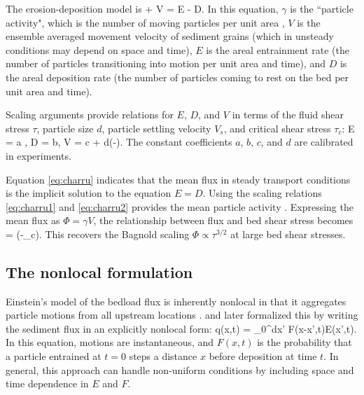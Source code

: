 The erosion-deposition model is
\be \pt \gamma +  \px V \gamma = E - D. \label{eq:charru}\ee
In this equation, $\gamma$ is the ``particle activity", which is the number of moving particles per unit area \citep{Furbish2012}, $V$ is the ensemble averaged movement velocity of sediment grains (which in unsteady conditions may depend on space and time), $E$ is the areal entrainment rate (the number of particles transitioning into motion per unit area and time), and $D$ is the areal deposition rate (the number of particles coming to rest on the bed per unit area and time).

Scaling arguments provide relations for $E$, $D$, and $V$ in terms of the fluid shear stress $\tau$, particle size $d$, particle settling velocity $V_s$, and critical shear stress $\tau_c$:
\be E = a , \label{eq:charru1}\ee
\be D  = b, \ee
\be V = c + d(\sqrt{\tau}-). \label{eq:charru2}\ee
The constant coefficients $a$, $b$, $c$, and $d$ are calibrated in experiments.

Equation \ref{eq:charru} indicates that the mean flux in steady transport conditions is the implicit solution to the equation $E = D.$
Using the scaling relations \ref{eq:charru1} and \ref{eq:charru2} provides the mean particle activity
\be \gamma \propto {}.\ee
Expressing the mean flux as $\Phi = \gamma V$, the relationship between flux and bed shear stress becomes
\be \Phi = \big(\tau-\tau_c\big). \ee
This recovers the Bagnold scaling $\Phi \propto \tau^{3/2}$ at large bed shear stresses.

\subsection{The nonlocal formulation}
\label{sec:nonlocal}

Einstein's model of the bedload flux is inherently nonlocal in that it aggregates particle motions from all upstream locations \citep{Schumer2009,Tucker2010a,Martin2012}.
\citet{Nakagawa1976} and later \citet{Parker2000} formalized this by writing the sediment flux in an explicitly nonlocal form:
\be q(x,t) = \int_0^\infty dx' F(x-x',t)E(x',t). \ee
In this equation, motions are instantaneous, and $F(x,t)$ is the probability that a particle entrained at $t=0$ steps a distance $x$ before deposition at time $t$.
In general, this approach can handle non-uniform conditions by including space and time dependence in $E$ and $F$.

